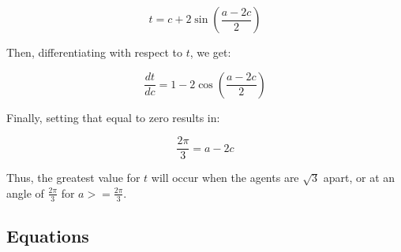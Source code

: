 \documentclass[11pt]{article}
\begin{document}
\begin{flushleft}
\[ t = c + 2 \sin (\frac{a - 2c}{2}) \]

\vspace*{5mm} Then, differentiating with respect to $t$, we get:

\[ \frac{dt}{dc} = 1 - 2 \cos (\frac{a - 2c}{2}) \]

\vspace*{5mm} Finally, setting that equal to zero results in:

\[ \frac{2\pi}{3} = a - 2c \]

\vspace*{5mm} Thus, the greatest value for $t$ will occur when the agents are $\sqrt{3}$ apart,
or at an angle of $ \frac{2\pi}{3}$ for $a >= \frac{2\pi}{3}$.



\end{flushleft}

\subsection {Equations}
\end{document}
